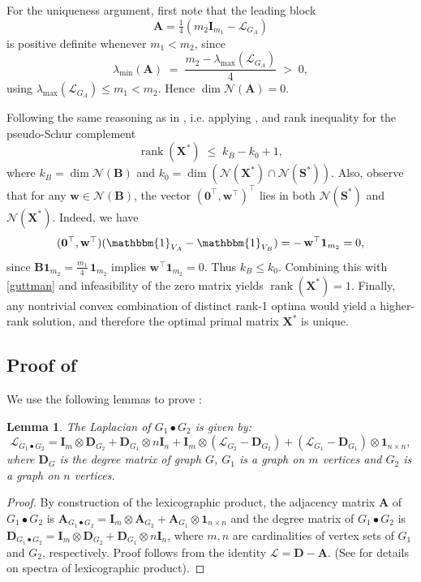 \documentclass[a4paper,fleqn]{cas-sc}
\newcommand{\X}{\mathbf{X}}
\renewcommand{\L}{\mathcal{L}}
\newcommand{\I}{\mathbf{I}}
\newcommand{\1}{\mathbf{1}}
\newcommand{\A}{\mathbf{A}}
\newcommand{\bz}{\mathbf{0}}
\newcommand{\B}{\mathbf{B}}
\newcommand{\bS}{\mathbf{S}}
\newcommand{\ind}{\mathbbm{1}}
\newcommand*{\myQED}{\hfill \scalebox{0.59}{\fbox{\rule{0.08mm}{0pt}\rule{0pt}{1.3mm}}}}%
\newtheorem{lemma}[theorem]{Lemma}
\DeclareMathOperator{\rank}{rank}
\begin{document}
For the uniqueness argument, first note that the leading block  
\[
\A=\tfrac14(m_2 \I_{m_1}-\L_{G_A})
\]
is positive definite whenever \(m_1 < m_2\), since
\[
\lambda_{\min}(\A) \;=\; \frac{m_2 - \lambda_{\max}(\L_{G_A})}{4} \;>\; 0,
\]
using \(\lambda_{\max}(\L_{G_A}) \le m_1 < m_2\). Hence \( \dim \mathcal{N} (\A)=0\).

Following the same reasoning as in , i.e. applying , and rank inequality for the pseudo-Schur complement 
\begin{equation}\label{guttman}
    \rank(\X^*) \;\le\; k_B - k_0 + 1,
\end{equation}
where \(k_B = \dim \mathcal{N}(\B)\) and  
$k_0 = \dim\left( \mathcal{N}(\X^*) \cap \mathcal{N}(\bS^*) \right)$. Also, observe that for any \(\mathbf{w} \in \mathcal{N}(\B)\), the vector \((\bz^{\top}, \mathbf{w}^{\top})^{\top}\) lies in both \(\mathcal{N}(\bS^*)\) and \(\mathcal{N}(\X^*)\). Indeed, we have
\[
(\bz^{\top}, \mathbf{w}^{\top}) (\ind_{V_A} - \ind_{V_B})
= -\,\mathbf{w}^{\top}\1_{m_2} = 0,
\]
since \(\B\1_{m_2} = \tfrac{m_1}{4}\,\1_{m_2}\) implies \(\mathbf{w}^{\top} \1_{m_2} = 0\).
Thus \(k_B \le k_0\). Combining this with \eqref{guttman} and infeasibility of the zero matrix yields \(\rank(\X^*) = 1\). Finally, any nontrivial convex combination of distinct rank-1 optima would yield a higher-rank solution, and therefore the optimal primal matrix \(\X^*\) is unique.\myQED



\subsection{Proof of }{\label{sec4.5}}
We use the following lemmas to prove : 

\begin{lemma}\label{lem:1}
The Laplacian of $G_1 \bullet G_2$ is given by:
$$\L_{G_1 \bullet G_2} = \I_m \otimes\mathbf{D}_{G_2} + \mathbf{D}_{G_1} \otimes n \I_n + \I_m \otimes (\L_{G_2} - \mathbf{D}_{G_2}) + (\L_{G_1} - \mathbf{D}_{G_1}) \otimes \1_{n \times n},$$ where $\mathbf{D}_{G}$ is the degree matrix of graph $G$, $G_1$ is a graph on $m$ vertices and $G_2$ is a graph on $n$ vertices.
\end{lemma}
\begin{proof}
By construction of the lexicographic product, the adjacency matrix $\mathbf{A}$ of $G_1 \bullet G_2$ is $\mathbf{A}_{G_1 \bullet G_2} =
\I_m \otimes \mathbf{A}_{G_2} + \mathbf{A}_{G_1}\otimes \1_{n \times n}$ and the degree matrix of $G_1 \bullet G_2$ is $\mathbf{D}_{G_1 \bullet G_2} = \I_m \otimes \mathbf{D}_{G_2} + \mathbf{D}_{G_1} \otimes n \I_n$, where $m,n$ are cardinalities of vertex sets of $G_1$ and $G_2$, respectively. Proof follows from the identity $\L = \mathbf{D} - \mathbf{A}$.
(See \citep{barik2015laplacian} for details on spectra of lexicographic product).
\end{proof}
\end{document}
